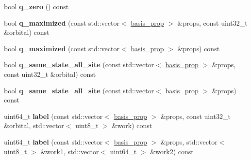 \begin{DoxyCompactItemize}
\item 
\mbox{\label{classqbasis_1_1mbasis__elem_a77477fa3e5759acc1a737b7fdebf7d92}} 
bool {\bfseries q\+\_\+zero} () const
\item 
\mbox{\label{classqbasis_1_1mbasis__elem_a8b1096b5670f37b97ea8b42c52872347}} 
bool {\bfseries q\+\_\+maximized} (const std\+::vector$<$ \hyperlink{classqbasis_1_1basis__prop}{basis\+\_\+prop} $>$ \&props, const uint32\+\_\+t \&orbital) const
\item 
\mbox{\label{classqbasis_1_1mbasis__elem_a3bc5a2a8c4d7cf75804f2d3fc0eca78a}} 
bool {\bfseries q\+\_\+maximized} (const std\+::vector$<$ \hyperlink{classqbasis_1_1basis__prop}{basis\+\_\+prop} $>$ \&props) const
\item 
\mbox{\label{classqbasis_1_1mbasis__elem_a51082148e35d3ffa9fc17ef8b63961b9}} 
bool {\bfseries q\+\_\+same\+\_\+state\+\_\+all\+\_\+site} (const std\+::vector$<$ \hyperlink{classqbasis_1_1basis__prop}{basis\+\_\+prop} $>$ \&props, const uint32\+\_\+t \&orbital) const
\item 
\mbox{\label{classqbasis_1_1mbasis__elem_a6a918d26b0d5f52a595603be3f976f36}} 
bool {\bfseries q\+\_\+same\+\_\+state\+\_\+all\+\_\+site} (const std\+::vector$<$ \hyperlink{classqbasis_1_1basis__prop}{basis\+\_\+prop} $>$ \&props) const
\item 
\mbox{\label{classqbasis_1_1mbasis__elem_aeac7496b565ab8ef3bc5db26a0937d17}} 
uint64\+\_\+t {\bfseries label} (const std\+::vector$<$ \hyperlink{classqbasis_1_1basis__prop}{basis\+\_\+prop} $>$ \&props, const uint32\+\_\+t \&orbital, std\+::vector$<$ uint8\+\_\+t $>$ \&work) const
\item 
\mbox{\label{classqbasis_1_1mbasis__elem_a5658fe9ad6fdc08f0156802bad6b4861}} 
uint64\+\_\+t {\bfseries label} (const std\+::vector$<$ \hyperlink{classqbasis_1_1basis__prop}{basis\+\_\+prop} $>$ \&props, std\+::vector$<$ uint8\+\_\+t $>$ \&work1, std\+::vector$<$ uint64\+\_\+t $>$ \&work2) const
\item 
\mbox{\label{classqbasis_1_1mbasis__elem_a45666124681a693445f4553f7c6c1cc3}} 

\end{DoxyCompactItemize}
